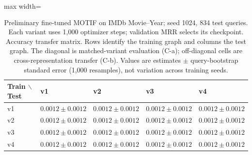 \begin{table}[htbp]
\centering
\small
\renewcommand{\arraystretch}{1.15}
\setlength{\tabcolsep}{5pt}
\begin{adjustbox}{max width=\linewidth}
\begin{tabular}{|l|l|l|l|l|}
\hline
\textbf{Train $\backslash$ Test} & \textbf{v1} & \textbf{v2} & \textbf{v3} & \textbf{v4} \\
\hline
v1 & $0.0012 \pm 0.0012$ & $0.0012 \pm 0.0012$ & $0.0012 \pm 0.0012$ & $0.0012 \pm 0.0012$ \\
\hline
v2 & $0.0012 \pm 0.0012$ & $0.0012 \pm 0.0012$ & $0.0012 \pm 0.0012$ & $0.0012 \pm 0.0012$ \\
\hline
v3 & $0.0012 \pm 0.0012$ & $0.0012 \pm 0.0012$ & $0.0012 \pm 0.0012$ & $0.0012 \pm 0.0012$ \\
\hline
v4 & $0.0012 \pm 0.0012$ & $0.0012 \pm 0.0012$ & $0.0012 \pm 0.0012$ & $0.0012 \pm 0.0012$ \\
\hline
\end{tabular}
\end{adjustbox}
\caption{Preliminary fine-tuned MOTIF on IMDb Movie--Year; seed 1024, 834 test queries. Each variant uses 1,000 optimizer steps; validation MRR selects its checkpoint. Accuracy transfer matrix. Rows identify the training graph and columns the test graph. The diagonal is matched-variant evaluation (C-a); off-diagonal cells are cross-representation transfer (C-b). Values are estimates $\pm$ query-bootstrap standard error (1,000 resamples), not variation across training seeds.}
\label{tab:motif-imdb-movie-year-matrix-transfer-accuracy}
\end{table}
